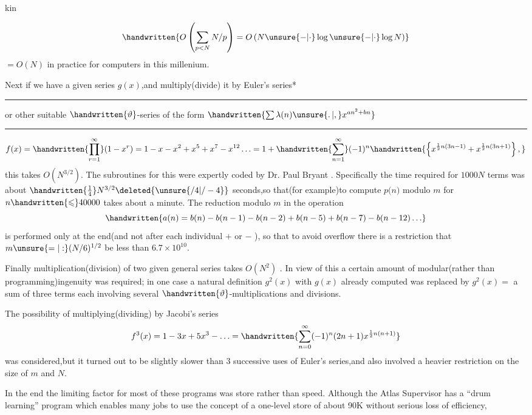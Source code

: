 \begin{flushright}
kin 
\end{flushright}

\[
\handwritten{O\left(\sum_{p<N}N/p\right)=O\left(N\unsure{-|\cdot}\log\unsure{-|\cdot}\log N\right)}
\]
$=O(N)$ in practice for computers in this millenium.

Next if we have a given series $g(x)$,and multiply(divide) it by Euler's series*

\noindent\rule{\linewidth}{0.3pt}\par
\noindent *or other suitable $\handwritten{\vartheta}$-series of the form $\handwritten{\sum\lambda(n)\unsure{\ldotp|,}x^{an^{2}+bn}}$
\par\noindent\rule{\linewidth}{0.3pt}
{\small
\[
f(x)=\handwritten{\prod_{r=1}^{\infty}}(1-x^{r})=1-x-x^{2}+x^{5}+x^{7}-x^{12}\ldots=1+\handwritten{\sum_{n=1}^{\infty}}(-1)^{n}\handwritten{\left\{x^{\frac12 n(3n-1)}+x^{\frac12 n(3n+1)}\right\},}
\]
}
this takes $O(N^{3/2})$. The subroutines for this were expertly coded by Dr. Paul Bryant . Specifically the time required for $1000N$ terms was about $\handwritten{\frac14}N^{3/2}\deleted{\unsure{/4|/-4}}$\reversemarginpar{} seconds,so that(for example)to compute \uline{$p(n$}$)$ modulo \uline{$m$} for $n\handwritten{\leqslant}40000$ takes about a minute. The reduction modulo $m$ in the operation
\[
\handwritten{a(n)=b(n)-b(n-1)-b(n-2)+b(n-5)+b(n-7)-b(n-12)\ldots}
\]
is performed only at the end(and not after each individual $+$ or $-$ ), so that to avoid overflow there is a restriction that $m\unsure{=|:}(N/6)^{1/2}$ be less than $6.7\times10^{10}$.

Finally multiplication(division) of two given general series takes $O(N^{2})$ . In view of this a certain amount of modular(rather than programming)ingenuity was required; in one case a natural definition $g^{2}(x)$ with $g(x)$ already computed was replaced by $g^{2}(x)=$ a sum of three terms each involving several $\handwritten{\vartheta}$-multiplications and divisions.

The possibility of multiplying(dividing) by Jacobi's series
\[
f^{3}(x)=1-3x+5x^{3}-\ldots=\handwritten{\sum_{n=0}^{\infty}(-1)^{n}(2n+1)x^{\frac12 n(n+1)}}
\]
was considered,but it turned out to be slightly slower than 3 successive uses of Euler's series,and also involved a heavier restriction on the size of $m$ and $N$.

In the end the limiting factor for most of these programs was store rather than speed. Although the Atlas Supervisor has a ``drum learning'' program which enables many jobs to use the concept of a one-level store of about 90K without serious loss of efficiency,
\normalmarginpar

